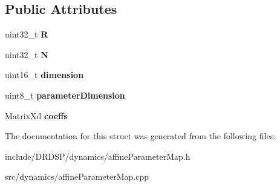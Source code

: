 \subsection*{Public Attributes}
\begin{DoxyCompactItemize}
\item 
\hypertarget{struct_d_r_d_s_p_1_1_affine_parameter_map_a7c4c0f072f5248a9c5cf65b813fcb836}{uint32\-\_\-t {\bfseries R}}\label{struct_d_r_d_s_p_1_1_affine_parameter_map_a7c4c0f072f5248a9c5cf65b813fcb836}

\item 
\hypertarget{struct_d_r_d_s_p_1_1_affine_parameter_map_a5f12477a00c6f104a97b240cb5a81295}{uint32\-\_\-t {\bfseries N}}\label{struct_d_r_d_s_p_1_1_affine_parameter_map_a5f12477a00c6f104a97b240cb5a81295}

\item 
\hypertarget{struct_d_r_d_s_p_1_1_affine_parameter_map_aed859f95d6b7ea0850f84242df5379ab}{uint16\-\_\-t {\bfseries dimension}}\label{struct_d_r_d_s_p_1_1_affine_parameter_map_aed859f95d6b7ea0850f84242df5379ab}

\item 
\hypertarget{struct_d_r_d_s_p_1_1_affine_parameter_map_a210acc8ae8c11b4b2c9360e42ccafb00}{uint8\-\_\-t {\bfseries parameter\-Dimension}}\label{struct_d_r_d_s_p_1_1_affine_parameter_map_a210acc8ae8c11b4b2c9360e42ccafb00}

\item 
\hypertarget{struct_d_r_d_s_p_1_1_affine_parameter_map_a760993390cbbec42011c1e1e76a44660}{Matrix\-Xd {\bfseries coeffs}}\label{struct_d_r_d_s_p_1_1_affine_parameter_map_a760993390cbbec42011c1e1e76a44660}

\end{DoxyCompactItemize}


The documentation for this struct was generated from the following files\-:\begin{DoxyCompactItemize}
\item 
include/\-D\-R\-D\-S\-P/dynamics/affine\-Parameter\-Map.\-h\item 
src/dynamics/affine\-Parameter\-Map.\-cpp\end{DoxyCompactItemize}
